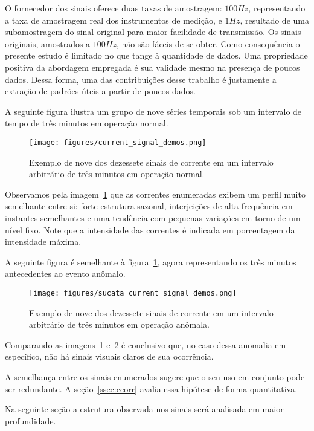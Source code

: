 O fornecedor dos sinais oferece duas taxas de amostragem: $100Hz$,
representando a taxa de amostragem real dos instrumentos de medição, e $1Hz$,
resultado de uma subamostragem do sinal original para maior facilidade de
transmissão. Os sinais originais, amostrados a $100Hz$, não são fáceis de se
obter. Como consequência o presente estudo é limitado no que tange à quantidade
de dados. Uma propriedade positiva da abordagem empregada é sua validade mesmo
na presença de poucos dados. Dessa forma, uma das contribuições desse trabalho
é justamente a extração de padrões úteis a partir de poucos dados.

A seguinte figura ilustra um grupo de nove séries temporais sob um intervalo
de tempo de três minutos em operação normal.

\begin{figure}[H]
    \centering
    \texttt{[image: figures/current\_signal\_demos.png]}
    \caption{Exemplo de nove dos dezessete sinais de corrente em um intervalo
    arbitrário de três minutos em operação normal.}
    \label{fig:demo}
\end{figure}

Observamos pela imagem~\ref{fig:demo} que as correntes enumeradas exibem um
perfil muito semelhante entre si: forte estrutura sazonal, interjeições de alta
frequência em instantes semelhantes e uma tendência com pequenas variações em
torno de um nível fixo. Note que a intensidade das correntes é indicada em
porcentagem da intensidade máxima.

A seguinte figura é semelhante à figura~\ref{fig:demo}, agora representando os
três minutos antecedentes ao evento anômalo.

\begin{figure}[H]
    \centering
    \texttt{[image: figures/sucata\_current\_signal\_demos.png]}
    \caption{Exemplo de nove dos dezessete sinais de corrente em um intervalo
    arbitrário de três minutos em operação anômala.}
    \label{fig:demo_anomalous}
\end{figure}

Comparando as imagens~\ref{fig:demo} e~\ref{fig:demo_anomalous} é conclusivo
que, no caso dessa anomalia em específico, não há sinais visuais claros de sua
ocorrência.

A semelhança entre os sinais enumerados  sugere que o seu uso em conjunto pode
ser redundante. A seção~\ref{ssec:ccorr} avalia essa hipótese de forma
quantitativa.

Na seguinte seção a estrutura observada nos sinais será analisada em maior
profundidade.


